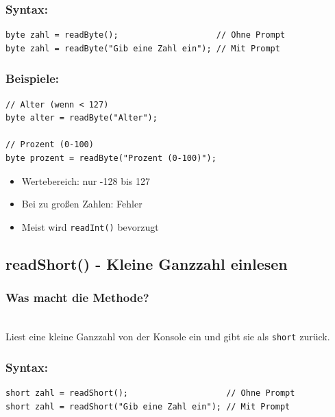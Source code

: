 \subsubsection*{Syntax:}
\begin{lstlisting}
byte zahl = readByte();                    // Ohne Prompt
byte zahl = readByte("Gib eine Zahl ein"); // Mit Prompt
\end{lstlisting}

\subsubsection*{Beispiele:}
\begin{lstlisting}
// Alter (wenn < 127)
byte alter = readByte("Alter");

// Prozent (0-100)
byte prozent = readByte("Prozent (0-100)");
\end{lstlisting}

\begin{achtung}
	\begin{itemize}
		\item Wertebereich: nur -128 bis 127
		\item Bei zu großen Zahlen: Fehler
		\item Meist wird \texttt{readInt()} bevorzugt
	\end{itemize}
\end{achtung}

\newpage


\subsection*{readShort() - Kleine Ganzzahl einlesen}

\subsubsection*{Was macht die Methode?}\\
Liest eine kleine Ganzzahl von der Konsole ein und gibt sie als \texttt{short} zurück.

\subsubsection*{Syntax:}
\begin{lstlisting}
short zahl = readShort();                    // Ohne Prompt
short zahl = readShort("Gib eine Zahl ein"); // Mit Prompt
\end{lstlisting}


